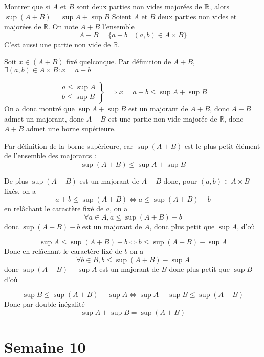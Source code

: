 \documentclass{article}
\renewenvironment{question_kholle}[2][ ]
{
	\subsection{\texorpdfstring{#2}{}}
	\notblank{#1}
	{
		\noindent #1
		\bigbreak
	}
	{}
	\begin{proof}
}
{
	\end{proof}
}
\begin{document}
\begin{question_kholle}[]{Montrer que si $A$ et $B$ sont deux parties non vides majorées de $\mathbb R$, alors $\sup(A+B) = \sup A + \sup B$}
  Soient $A$ et $B$ deux parties non vides et majorées de $\mathbb{R}$. On note $A+B$ l'ensemble
$$
  A+B = \{ a+b \mid (a, b) \in A\times B \}
$$
  C'est aussi une partie non vide de $\mathbb{R}$.
  
  Soit $x \in (A+B)$ fixé quelconque. Par définition de $A+B$, $\exists(a, b) \in A\times B : x=a+b$
  
$$
  \left. \begin{array}{ll}
    a \leqslant \sup A\\
    b \leqslant \sup B
  \end{array}\right\} \implies x = a+b \leqslant \sup A + \sup B
$$
  On a donc montré que $\sup A+\sup B$ est un majorant de $A+B$, donc $A+B$ admet un majorant, donc $A+B$ est une partie non vide majorée de $\mathbb{R}$, donc $A+B$ admet une borne supérieure.
  
  Par définition de la borne supérieure, car $\sup(A+B)$ est le plus petit élément de l'ensemble des majorants :
$$\sup(A+B) \leqslant \sup A + \sup B$$
  
  De plus $\sup(A+B)$ est un majorant de $A+B$ donc, pour $(a, b) \in A\times B$ fixés, on a
$$
  a+b \leqslant \sup (A+B) \iff a \leqslant \sup(A+B) -b
$$
  en relâchant le caractère fixé de $a$, on a
$$
  \forall a \in A, a\leqslant \sup(A+B) - b
$$
  donc $\sup(A+B) - b$ est un majorant de $A$, donc plus petit que $\sup A$, d'où
  
$$
  \sup A \leqslant \sup(A+B) - b \iff b \leqslant \sup(A+B) - \sup A
$$
  Donc en relâchant le caractère fixé de $b$ on a
$$
  \forall b \in B, b\leqslant \sup(A+B) - \sup A
$$
  donc $\sup(A+B) - \sup A$ est un majorant de $B$ donc plus petit que $\sup B$
  d'où
  
$$
  \sup B \leqslant \sup(A+B) - \sup A \iff \sup A + \sup B \leqslant \sup (A+B)
$$
  Donc par double inégalité
$$
  \sup A + \sup B = \sup (A+B)
$$
  
\end{question_kholle}
\pagebreak\section{Semaine 10}
\end{document}
